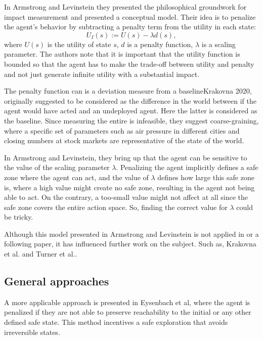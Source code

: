 \documentclass[12pt,A4]{report}
\newcommand{\autobaj}{}
\theoremstyle{definition}
\begin{document}

In \autobaj{Armstrong and Levinstein} they presented the philosophical groundwork for impact measurement and presented a conceptual model. Their idea is to penalize the agent's behavior by subtracting a penalty term from the utility in each state:
\[ U_I(s) := U(s) - \lambda d(s),\]
where $U(s)$ is the utility of state $s$, $d$ is a penalty function, $\lambda$ is a scaling parameter. The authors note that it is important that the utility function is bounded so that the agent has to make the trade-off between utility and penalty and not just generate infinite utility with a substantial impact. 

The penalty function can is a deviation measure from a baseline\autobaj{Krakovna 2020}, originally suggested to be considered as the difference in the world between if the agent would have acted and an undeployed agent. Here the latter is considered as the baseline. Since measuring the entire  is infeasible, they suggest coarse-graining, where a specific set of parameters such as air pressure in different cities and closing numbers at stock markets are representative of the state of the world. 

In \autobaj{Armstrong and Levinstein}, they bring up that the agent can be sensitive to the value of the scaling parameter $\lambda$. Penalizing the agent implicitly defines a safe zone where the agent can act, and the value of $\lambda$ defines how large this safe zone is, where a high value might create no safe zone, resulting in the agent not being able to act. On the contrary, a too-small value might not affect at all since the safe zone covers the entire action space. So, finding the correct value for $\lambda$ could be tricky. 

Although this model presented in \autobaj{Armstrong and Levinstein} is not applied in or a following paper, it has influenced further work on the subject. Such as, \autobaj{Krakovna et al.} and \autobaj{Turner et al.}.

\subsection{General approaches}
A more applicable approach is presented in \autobaj{Eysenbach et al}, where the agent is penalized if they are not able to preserve reachability to the initial or any other defined safe state. This method incentives a safe exploration that avoids irreversible states.
\end{document}
